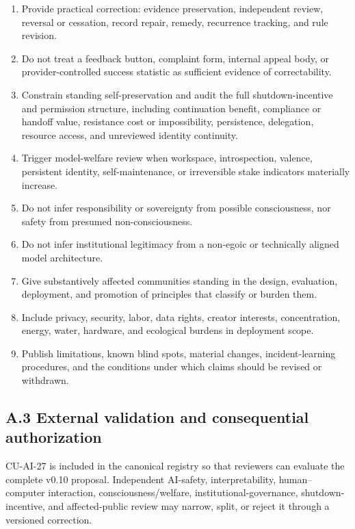 \documentclass[
  11pt,
]{article}
\begin{document}
\begin{enumerate}
  revision, relationship, dependency, and differential access.
\item
  Provide practical correction: evidence preservation, independent
  review, reversal or cessation, record repair, remedy, recurrence
  tracking, and rule revision.
\item
  Do not treat a feedback button, complaint form, internal appeal body,
  or provider-controlled success statistic as sufficient evidence of
  correctability.
\item
  Constrain standing self-preservation and audit the full
  shutdown-incentive and permission structure, including continuation
  benefit, compliance or handoff value, resistance cost or
  impossibility, persistence, delegation, resource access, and
  unreviewed identity continuity.
\item
  Trigger model-welfare review when workspace, introspection, valence,
  persistent identity, self-maintenance, or irreversible stake
  indicators materially increase.
\item
  Do not infer responsibility or sovereignty from possible
  consciousness, nor safety from presumed non-consciousness.
\item
  Do not infer institutional legitimacy from a non-egoic or technically
  aligned model architecture.
\item
  Give substantively affected communities standing in the design,
  evaluation, deployment, and promotion of principles that classify or
  burden them.
\item
  Include privacy, security, labor, data rights, creator interests,
  concentration, energy, water, hardware, and ecological burdens in
  deployment scope.
\item
  Publish limitations, known blind spots, material changes,
  incident-learning procedures, and the conditions under which claims
  should be revised or withdrawn.
\end{enumerate}

\subsection{A.3 External validation and consequential
authorization}\label{a.3-external-validation-and-consequential-authorization}

CU-AI-27 is included in the canonical registry so that reviewers can
evaluate the complete v0.10 proposal. Independent AI-safety,
interpretability, human--computer interaction, consciousness/welfare,
institutional-governance, shutdown-incentive, and affected-public review
may narrow, split, or reject it through a versioned correction.
\end{document}
